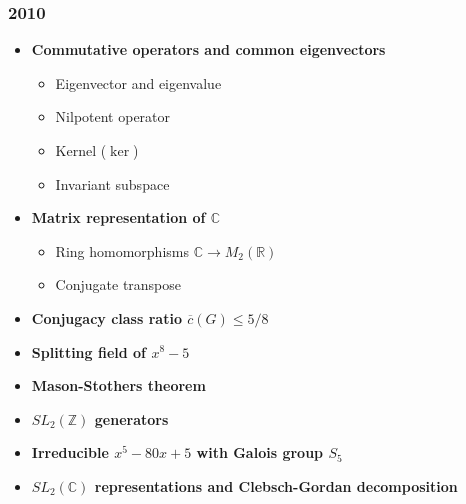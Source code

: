 \subsubsection*{2010}
\begin{itemize}
    \item \textbf{Commutative operators and common eigenvectors}
        \begin{itemize}
            \item Eigenvector and eigenvalue
            \item Nilpotent operator
            \item Kernel ($\ker$)
            \item Invariant subspace
        \end{itemize}
    \item \textbf{Matrix representation of $\mathbb{C}$}
        \begin{itemize}
            \item Ring homomorphisms $\mathbb{C} \to M_2(\mathbb{R})$
            \item Conjugate transpose
        \end{itemize}
    \item \textbf{Conjugacy class ratio $\overline{c}(G) \leq 5/8$}
    \item \textbf{Splitting field of $x^8-5$}
    \item \textbf{Mason-Stothers theorem}
    \item \textbf{$SL_2(\mathbb{Z})$ generators}
    \item \textbf{Irreducible $x^5-80x+5$ with Galois group $S_5$}
    \item \textbf{$SL_2(\mathbb{C})$ representations and Clebsch-Gordan decomposition}
\end{itemize}

